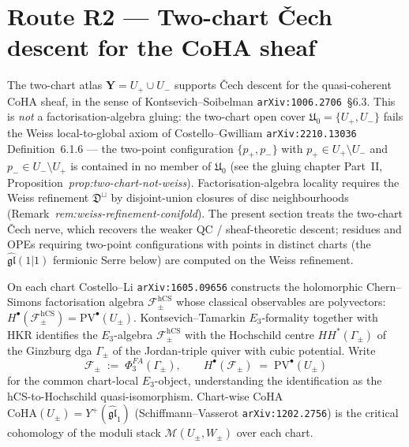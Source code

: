 \documentclass[11pt]{amsart}
\theoremstyle{definition}
\providecommand{\CoHA}{\mathrm{CoHA}}
\providecommand{\bY}{\mathbf{Y}}
\providecommand{\cF}{\mathcal{F}}
\providecommand{\cM}{\mathcal{M}}
\providecommand{\fgl}{\mathfrak{gl}}
\providecommand{\fU}{\mathfrak{U}}
\providecommand{\fD}{\mathfrak{D}}
\begin{document}
\section{Route R2 --- Two-chart \v{C}ech descent for the CoHA sheaf}
\label{sec:cech-route}

The two-chart atlas $\bY = U_+ \cup U_-$ supports \v{C}ech descent for
the quasi-coherent CoHA sheaf, in the sense of Kontsevich--Soibelman
\texttt{arXiv:1006.2706}~\S6.3. This is \emph{not} a factorisation-algebra
gluing: the two-chart open cover $\fU_0 = \{U_+, U_-\}$ fails the Weiss
local-to-global axiom of Costello--Gwilliam \texttt{arXiv:2210.13036}
Definition~6.1.6 --- the two-point configuration $\{p_+, p_-\}$ with
$p_+ \in U_+ \setminus U_-$ and $p_- \in U_- \setminus U_+$ is contained
in no member of $\fU_0$ (see the gluing chapter Part~II,
Proposition~\emph{prop:two-chart-not-weiss}). Factorisation-algebra
locality requires the Weiss refinement $\fD^{\sqcup}$ by disjoint-union
closures of disc neighbourhoods (Remark~\emph{rem:weiss-refinement-conifold}).
The present section treats the two-chart \v{C}ech nerve, which recovers the
weaker QC / sheaf-theoretic descent; residues and OPEs requiring two-point
configurations with points in distinct charts (the $\widehat{\fgl}(1|1)$
fermionic Serre below) are computed on the Weiss refinement.

On each chart Costello--Li \texttt{arXiv:1605.09656} constructs the
holomorphic Chern--Simons factorisation algebra $\cF_\pm^{\mathrm{hCS}}$
whose classical observables are polyvectors:
$H^\bullet(\cF_\pm^{\mathrm{hCS}}) = \mathrm{PV}^\bullet(U_\pm)$.
Kontsevich--Tamarkin $E_3$-formality together with HKR identifies the
$E_3$-algebra $\cF_\pm^{\mathrm{hCS}}$ with the Hochschild centre
$HH^*(\Gamma_\pm)$ of the Ginzburg dga $\Gamma_\pm$ of the Jordan-triple
quiver with cubic potential. Write
\[
  \cF_\pm \;:=\; \Phi^{FA}_3(\Gamma_\pm),
  \qquad
  H^\bullet(\cF_\pm) \;=\; \mathrm{PV}^\bullet(U_\pm)
\]
for the common chart-local $E_3$-object, understanding the identification
as the hCS-to-Hochschild quasi-isomorphism. Chart-wise CoHA
$\CoHA(U_\pm) = Y^+(\widehat{\fgl}_1)$ (Schiffmann--Vasserot
\texttt{arXiv:1202.2756}) is the critical cohomology of the moduli stack
$\cM(U_\pm, W_\pm)$ over each chart.
\end{document}
